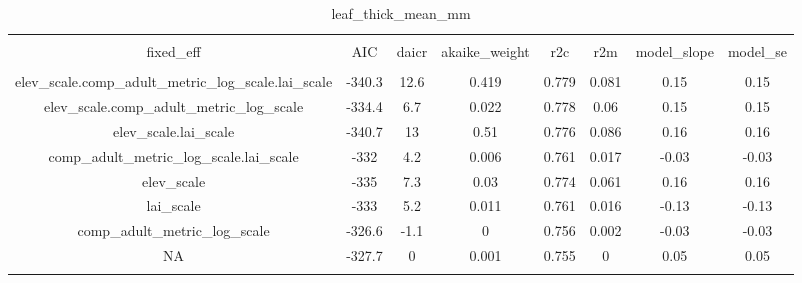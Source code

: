 
\begin{table}[!htbp] \centering 
  \caption{leaf_thick_mean_mm} 
  \label{leaf_thick_mean_mm} 
\begin{tabular}{@{\extracolsep{5pt}} cccccccc} 
\\[-1.8ex]\hline 
\hline \\[-1.8ex] 
fixed\_eff & AIC & daicr & akaike\_weight & r2c & r2m & model\_slope & model\_se \\ 
\hline \\[-1.8ex] 
elev\_scale.comp\_adult\_metric\_log\_scale.lai\_scale & -340.3 & 12.6 & 0.419 & 0.779 & 0.081 & 0.15 & 0.15 \\ 
elev\_scale.comp\_adult\_metric\_log\_scale & -334.4 & 6.7 & 0.022 & 0.778 & 0.06 & 0.15 & 0.15 \\ 
elev\_scale.lai\_scale & -340.7 & 13 & 0.51 & 0.776 & 0.086 & 0.16 & 0.16 \\ 
comp\_adult\_metric\_log\_scale.lai\_scale & -332 & 4.2 & 0.006 & 0.761 & 0.017 & -0.03 & -0.03 \\ 
elev\_scale & -335 & 7.3 & 0.03 & 0.774 & 0.061 & 0.16 & 0.16 \\ 
lai\_scale & -333 & 5.2 & 0.011 & 0.761 & 0.016 & -0.13 & -0.13 \\ 
comp\_adult\_metric\_log\_scale & -326.6 & -1.1 & 0 & 0.756 & 0.002 & -0.03 & -0.03 \\ 
NA & -327.7 & 0 & 0.001 & 0.755 & 0 & 0.05 & 0.05 \\ 
\hline \\[-1.8ex] 
\end{tabular} 
\end{table} 

